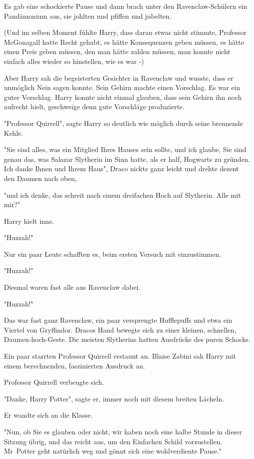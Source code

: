 {Es gab eine schockierte Pause und dann brach unter den Ravenclaw-Schülern ein Pandämonium aus, sie johlten und pfiffen und jubelten.

(Und im selben Moment fühlte Harry, dass daran etwas nicht stimmte, Professor McGonagall hatte Recht gehabt, es hätte Konsequenzen geben müssen, es hätte einen Preis geben müssen, den man hätte zahlen müssen, man konnte nicht einfach alles wieder so hinstellen, wie es war -)

Aber Harry sah die begeisterten Gesichter in Ravenclaw und wusste, dass er unmöglich Nein sagen konnte. Sein Gehirn machte einen Vorschlag. Es war ein guter Vorschlag. Harry konnte nicht einmal glauben, dass sein Gehirn ihn noch aufrecht hielt, geschweige denn gute Vorschläge produzierte.

"Professor Quirrell", sagte Harry so deutlich wie möglich durch seine brennende Kehle.

"Sie sind alles, was ein Mitglied Ihres Hauses sein sollte, und ich glaube, Sie sind genau das, was Salazar Slytherin im Sinn hatte, als er half, Hogwarts zu gründen. Ich danke Ihnen und Ihrem Haus", Draco nickte ganz leicht und drehte dezent den Daumen nach oben,

"und ich denke, das schreit nach einem dreifachen Hoch auf Slytherin. Alle mit mir?"

Harry hielt inne.

"Huzzah!"

Nur ein paar Leute schafften es, beim ersten Versuch mit einzustimmen.

"Huzzah!"

Diesmal waren fast alle aus Ravenclaw dabei.

"Huzzah!"

Das war fast ganz Ravenclaw, ein paar versprengte Hufflepuffs und etwa ein Viertel von Gryffindor. Dracos Hand bewegte sich zu einer kleinen, schnellen, Daumen-hoch-Geste. Die meisten Slytherins hatten Ausdrücke des puren Schocks.

Ein paar starrten Professor Quirrell erstaunt an. Blaise Zabini sah Harry mit einem berechnenden, faszinierten Ausdruck an.

Professor Quirrell verbeugte sich.

"Danke, Harry Potter", sagte er, immer noch mit diesem breiten Lächeln.

Er wandte sich an die Klasse.

"Nun, ob Sie es glauben oder nicht, wir haben noch eine halbe Stunde in dieser Sitzung übrig, und das reicht aus, um den Einfachen Schild vorzustellen. Mr~Potter geht natürlich weg und gönnt sich eine wohlverdiente Pause."

}
